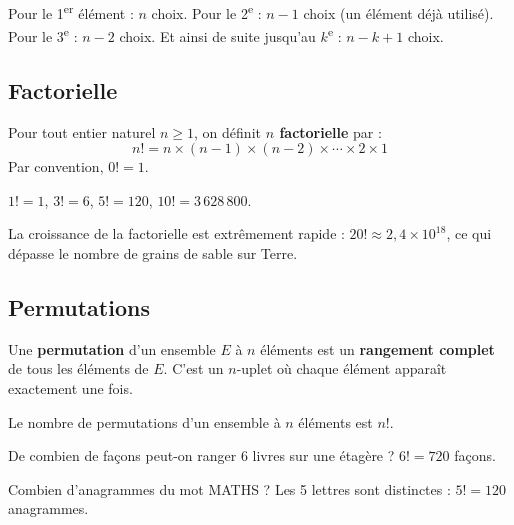 \documentclass[12pt,a4paper,twoside]{book}
\begin{document}
\begin{methode}
Pour le 1\textsuperscript{er} élément : $n$ choix. Pour le 2\textsuperscript{e} : $n-1$ choix (un élément déjà utilisé). Pour le 3\textsuperscript{e} : $n-2$ choix. Et ainsi de suite jusqu'au $k$\textsuperscript{e} : $n-k+1$ choix.
\end{methode}

\subsection{Factorielle}

\begin{definition}[Factorielle]
Pour tout entier naturel $n \geqslant 1$, on définit \textbf{$n$ factorielle} par :
\[ n! = n \times (n-1) \times (n-2) \times \cdots \times 2 \times 1 \]
Par convention, $0! = 1$.
\end{definition}

\begin{exemple}
$1! = 1$, \quad $3! = 6$, \quad $5! = 120$, \quad $10! = 3\,628\,800$.

\medskip

La croissance de la factorielle est extrêmement rapide : $20! \approx 2{,}4 \times 10^{18}$, ce qui dépasse le nombre de grains de sable sur Terre.
\end{exemple}

\subsection{Permutations}

\begin{definition}[Permutation]
Une \textbf{permutation} d'un ensemble $E$ à $n$ éléments est un \textbf{rangement complet} de tous les éléments de $E$. C'est un $n$-uplet où chaque élément apparaît exactement une fois.
\end{definition}

\begin{propriete}
Le nombre de permutations d'un ensemble à $n$ éléments est $n!$.
\end{propriete}

\begin{exemple}
De combien de façons peut-on ranger 6 livres sur une étagère ? $6! = 720$ façons.

\medskip

Combien d'anagrammes du mot MATHS ? Les 5 lettres sont distinctes : $5! = 120$ anagrammes.
\end{exemple}
\end{document}
